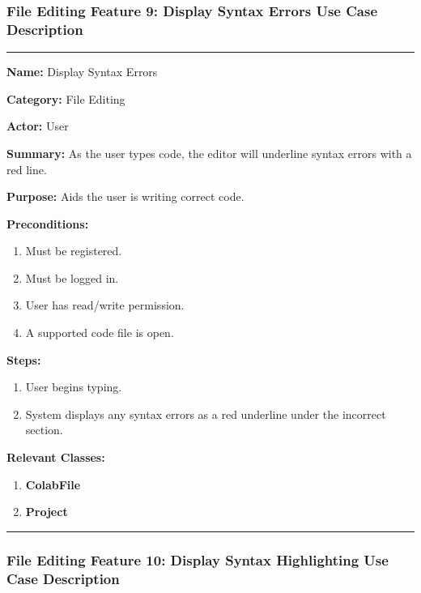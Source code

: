 \documentclass[twoside,letterpaper]{article}
\begin{document}
	\subsubsection[File Editing Feature 9: Display Syntax Errors]{\rmfamily\bfseries\color{black}
		File Editing Feature 9: Display Syntax Errors Use Case Description}
	\hypertarget{RefHeading22059017292}{}
	
	\vspace{2pt}
	\hrule
	\vspace{8pt}
		\noindent\textbf{Name:} Display Syntax Errors \newline
		
		\noindent\textbf{Category:} File Editing \newline
		
		\noindent\textbf{Actor:} User \newline
		
		\noindent\textbf{Summary:} As the user types code, the editor will underline syntax errors with a red line. \newline
		
		\noindent\textbf{Purpose:} Aids the user is writing correct code. \newline
		
		\noindent\textbf{Preconditions:}
		\begin{enumerate}
			\item Must be registered.
			\item Must be logged in.
			\item User has read/write permission.
			\item A supported code file is open.
		\end{enumerate}
		\noindent\textbf{Steps:}
		\begin{enumerate}
			\item User begins typing.
			\item System displays any syntax errors as a red underline under the incorrect section.
		\end{enumerate}
		\noindent\textbf{Relevant Classes:}
		\begin{enumerate}
		    \item \textbf {ColabFile}
		    \item \textbf {Project}
		\end{enumerate}    
	\vspace{8pt}
	\hrule
	\newpage
	
	\subsubsection[File Editing Feature 10: Display Syntax Highlighting]{\rmfamily\bfseries\color{black}
		File Editing Feature 10: Display Syntax Highlighting Use Case Description}
	\hypertarget{RefHeading22059017292}{}
	
\end{document}
